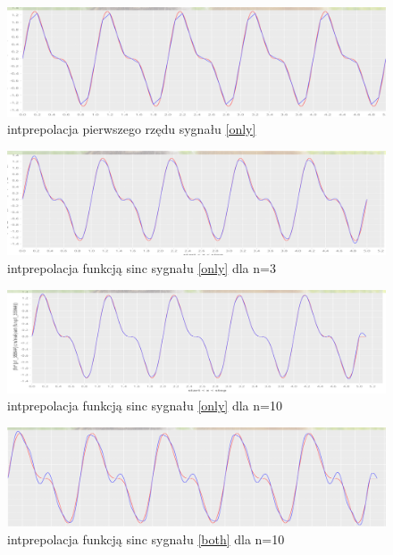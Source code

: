 \documentclass[12pt]{article}
\begin{document}
\begin{figure}[H]
	\includegraphics[width=\linewidth]{2z1.png}
	\caption{intprepolacja pierwszego rzędu sygnału \ref{only}}
\end{figure}

\begin{figure}[H]
	\includegraphics[width=\linewidth]{2zs3only.png}
	\caption{intprepolacja funkcją sinc sygnału \ref{only} dla n=3}
\end{figure}

\begin{figure}[H]
	\includegraphics[width=\linewidth]{2zs10only.png}
	\caption{intprepolacja funkcją sinc sygnału \ref{only} dla n=10}
\end{figure}

\begin{figure}[H]
	\includegraphics[width=\linewidth]{2zs10both.png}
	\caption{intprepolacja funkcją sinc sygnału \ref{both} dla n=10}
\end{figure}
\end{document}

